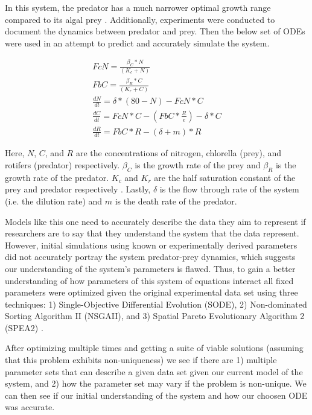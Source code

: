 \documentclass[twocolumn, 12pt]{article}
\begin{document}
In this system, the predator has a much narrower optimal growth range compared to its algal prey \cite{snell_effect_1986, sarma_effect_nodate, miracle_salinity_nodate}. Additionally, experiments were conducted to document the dynamics between predator and prey. Then the below set of ODEs were used in an attempt to predict and accurately simulate the system.  

\begin{align}
    FcN = \frac{\beta_C*N}{(K_c+N)} \\
    FbC = \frac{\beta_R*C}{(K_r+C)} \\
    \frac{dN}{dt}=\delta*(80-N)-FcN*C \\
    \frac{dC}{dt}=FcN*C-(FbC*\frac{R}{e})-\delta*C \\
    \frac{dR}{dt}=FbC*R-(\delta+m)*R 
\end{align}

Here, $N$, $C$, and $R$ are the concentrations of nitrogen, chlorella (prey), and rotifers (predator) respectively. $\beta_C$ is the growth rate of the prey and $\beta_R$ is the growth rate of the predator. $K_c$ and $K_r$ are the half saturation constant of the prey and predator respectively \cite{fussmann_crossing_2000}. Lastly, $\delta$ is the flow through rate of the system (i.e. the dilution rate) and $m$ is the death rate of the predator.  

Models like this one need to accurately describe the data they aim to represent if researchers are to say that they understand the system that the data represent. However, initial simulations using known or experimentally derived parameters did not accurately portray the system predator-prey dynamics, which suggests our understanding of the system's parameters is flawed. Thus, to gain a better understanding of how parameters of this system of equations interact all fixed parameters were optimized given the original experimental data set using three techniques: 1) Single-Objective Differential Evolution (SODE), 2) Non-dominated Sorting Algorithm II (NSGAII), and 3) Spatial Pareto Evolutionary Algorithm 2 (SPEA2) \cite{deb_fast_2002, zitzler_spea2:_nodate}.

After optimizing multiple times and getting a suite of viable solutions (assuming that this problem exhibits non-uniqueness) we see if there are 1) multiple parameter sets that can describe a given data set given our current model of the system, and 2) how the parameter set may vary if the problem is non-unique. We can then see if our initial understanding of the system and how our choosen ODE was accurate.   
\end{document}
